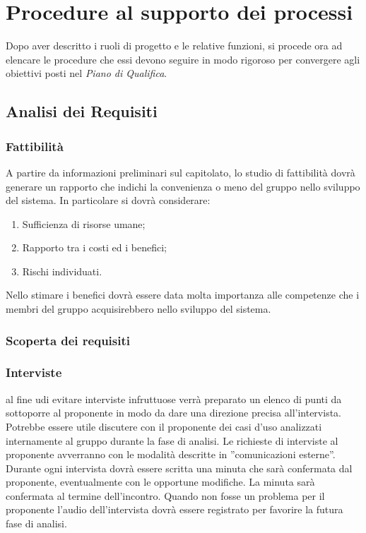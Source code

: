 \section{Procedure al supporto dei processi}{
Dopo aver descritto i ruoli di progetto e le relative funzioni, si procede ora ad elencare le procedure che essi devono seguire in modo rigoroso per convergere agli obiettivi posti nel \textit{Piano di Qualifica}.

	\subsection{Analisi dei Requisiti}{ 
	   \subsubsection{Fattibilità}{
	    		A partire da informazioni preliminari sul capitolato, lo studio di fattibilità dovrà generare un rapporto che indichi la convenienza o meno del gruppo nello sviluppo del sistema. In particolare si dovrà considerare:
	    		\begin{enumerate}
	    			\item Sufficienza di risorse umane;
	    			\item Rapporto tra i costi ed i benefici;
	    			\item Rischi individuati.
	    		\end{enumerate}
	    		Nello stimare i benefici dovrà essere data molta importanza alle competenze che i membri del gruppo acquisirebbero nello sviluppo del sistema.
	    	 }
		\subsubsection{Scoperta dei requisiti}{
			\subsubsection{Interviste}
			al fine udi evitare interviste infruttuose verrà preparato un elenco di punti da sottoporre al proponente in modo da dare una direzione precisa all’intervista. Potrebbe essere utile discutere con il proponente dei casi d'uso analizzati internamente al gruppo durante la fase di analisi.
			Le richieste di interviste al proponente avverranno con le modalità descritte in ”comunicazioni esterne”. Durante ogni intervista dovrà essere scritta una minuta che sarà confermata dal proponente, eventualmente con le opportune modifiche. La minuta sarà confermata al termine dell’incontro. Quando non fosse un problema per il proponente l’audio dell’intervista dovrà essere registrato per favorire la futura fase di analisi.
}}}
